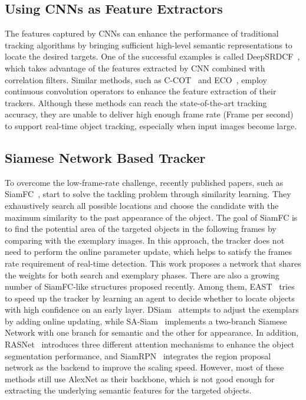 \documentclass[runningheads]{llncs}
\begin{document}
\subsection{Using CNNs as Feature Extractors}

The features captured by CNNs can enhance the performance of traditional tracking algorithms by bringing sufficient high-level semantic representations to locate the desired targets. One of the successful examples is called DeepSRDCF~\cite{danelljan2015convolutional}, which takes advantage of the features extracted by CNN combined with correlation filters. Similar methods, such as C-COT~\cite{danelljan2016beyond} and ECO~\cite{danelljan2017eco}, employ continuous convolution operators to enhance the feature extraction of their trackers. Although these methods can reach the state-of-the-art tracking accuracy, they are unable to deliver high enough frame rate (Frame per second) to support real-time object tracking, especially when input images become large.

\subsection{Siamese Network Based Tracker}
To overcome the low-frame-rate challenge, recently published papers, such as SiamFC~\cite{bertinetto2016fully}, start to solve the tackling problem through similarity learning. They exhaustively search all possible locations and
choose the candidate with the maximum similarity to the past appearance of the object. The goal of SiamFC is to find the potential area of the targeted objects in the following frames by comparing with the exemplary images. In this approach, the tracker does not need to perform the online parameter update, which helps to satisfy the frames rate requirement of real-time detection. This work proposes a network that shares the weights for both search and exemplary phases.
There are also a growing number of SiamFC-like structures proposed recently. Among them,  EAST~\cite{huang2017learning} tries to speed up the tracker by learning an agent to decide whether to locate objects with high confidence on an early layer. DSiam~\cite{guo2017learning} attempts to adjust the exemplars by adding online updating, while SA-Siam~\cite{he2018twofold} implements a two-branch Siamese Network with one branch for semantic and the other for appearance. In addition, RASNet~\cite{wang2018learning} introduces three different attention mechanisms to enhance the object segmentation performance, and SiamRPN~\cite{li2018high} integrates the region proposal network as the backend to improve the scaling speed. However, most of these methods still use AlexNet as their backbone, which is not good enough for extracting the underlying semantic features for the targeted objects.
\end{document}
